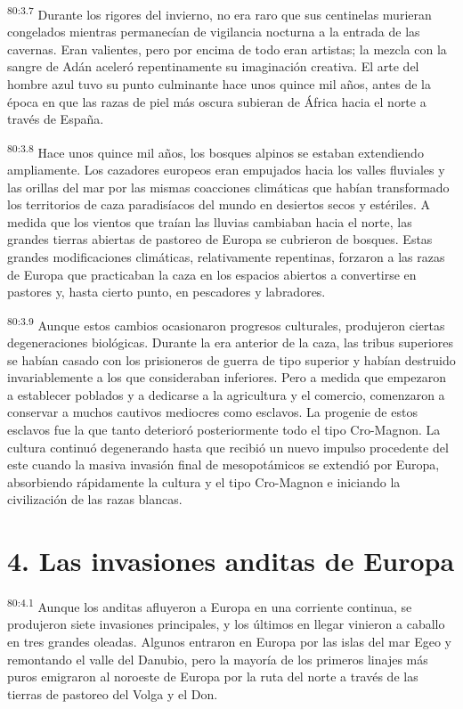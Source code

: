 \par
\textsuperscript{80:3.7} Durante los rigores del invierno, no era raro que sus centinelas murieran congelados mientras permanecían de vigilancia nocturna a la entrada de las cavernas. Eran valientes, pero por encima de todo eran artistas; la mezcla con la sangre de Adán aceleró repentinamente su imaginación creativa. El arte del hombre azul tuvo su punto culminante hace unos quince mil años, antes de la época en que las razas de piel más oscura subieran de África hacia el norte a través de España.

\par
\textsuperscript{80:3.8} Hace unos quince mil años, los bosques alpinos se estaban extendiendo ampliamente. Los cazadores europeos eran empujados hacia los valles fluviales y las orillas del mar por las mismas coacciones climáticas que habían transformado los territorios de caza paradisíacos del mundo en desiertos secos y estériles. A medida que los vientos que traían las lluvias cambiaban hacia el norte, las grandes tierras abiertas de pastoreo de Europa se cubrieron de bosques. Estas grandes modificaciones climáticas, relativamente repentinas, forzaron a las razas de Europa que practicaban la caza en los espacios abiertos a convertirse en pastores y, hasta cierto punto, en pescadores y labradores.

\par
\textsuperscript{80:3.9} Aunque estos cambios ocasionaron progresos culturales, produjeron ciertas degeneraciones biológicas. Durante la era anterior de la caza, las tribus superiores se habían casado con los prisioneros de guerra de tipo superior y habían destruido invariablemente a los que consideraban inferiores. Pero a medida que empezaron a establecer poblados y a dedicarse a la agricultura y el comercio, comenzaron a conservar a muchos cautivos mediocres como esclavos. La progenie de estos esclavos fue la que tanto deterioró posteriormente todo el tipo Cro-Magnon. La cultura continuó degenerando hasta que recibió un nuevo impulso procedente del este cuando la masiva invasión final de mesopotámicos se extendió por Europa, absorbiendo rápidamente la cultura y el tipo Cro-Magnon e iniciando la civilización de las razas blancas.

\section*{4. Las invasiones anditas de Europa}
\par
\textsuperscript{80:4.1} Aunque los anditas afluyeron a Europa en una corriente continua, se produjeron siete invasiones principales, y los últimos en llegar vinieron a caballo en tres grandes oleadas. Algunos entraron en Europa por las islas del mar Egeo y remontando el valle del Danubio, pero la mayoría de los primeros linajes más puros emigraron al noroeste de Europa por la ruta del norte a través de las tierras de pastoreo del Volga y el Don.

